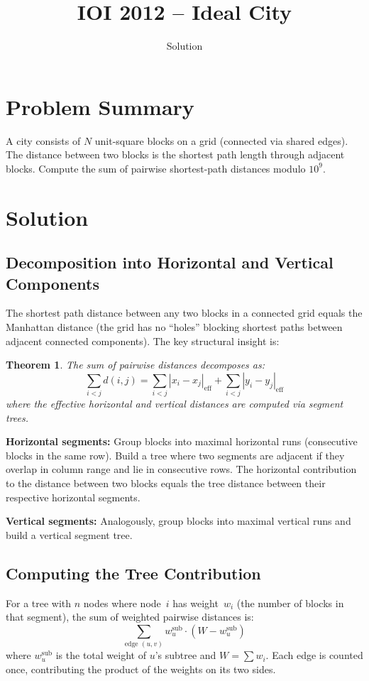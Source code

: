 \documentclass[11pt,a4paper]{article}
\title{IOI 2012 -- Ideal City}
\author{Solution}
\date{}
\newtheorem{theorem}{Theorem}
\begin{document}
\maketitle

\section{Problem Summary}
A city consists of $N$ unit-square blocks on a grid (connected via shared edges). The distance between two blocks is the shortest path length through adjacent blocks. Compute the sum of pairwise shortest-path distances modulo $10^9$.

\section{Solution}

\subsection{Decomposition into Horizontal and Vertical Components}
The shortest path distance between any two blocks in a connected grid equals the Manhattan distance (the grid has no ``holes'' blocking shortest paths between adjacent connected components). The key structural insight is:

\begin{theorem}
The sum of pairwise distances decomposes as:
\[
\sum_{i < j} d(i, j) = \sum_{i < j} |x_i - x_j|_{\mathrm{eff}} + \sum_{i < j} |y_i - y_j|_{\mathrm{eff}}
\]
where the effective horizontal and vertical distances are computed via segment trees.
\end{theorem}

\textbf{Horizontal segments:} Group blocks into maximal horizontal runs (consecutive blocks in the same row). Build a tree where two segments are adjacent if they overlap in column range and lie in consecutive rows. The horizontal contribution to the distance between two blocks equals the tree distance between their respective horizontal segments.

\textbf{Vertical segments:} Analogously, group blocks into maximal vertical runs and build a vertical segment tree.

\subsection{Computing the Tree Contribution}
For a tree with $n$ nodes where node~$i$ has weight~$w_i$ (the number of blocks in that segment), the sum of weighted pairwise distances is:
\[
\sum_{\text{edge } (u,v)} w_u^{\text{sub}} \cdot (W - w_u^{\text{sub}})
\]
where $w_u^{\text{sub}}$ is the total weight of $u$'s subtree and $W = \sum w_i$. Each edge is counted once, contributing the product of the weights on its two sides.
\end{document}
